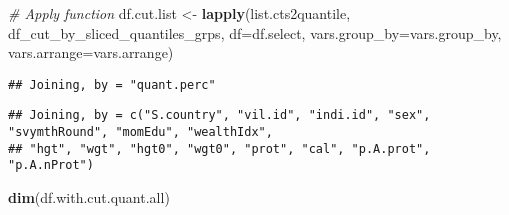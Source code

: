 \documentclass[
]{book}
\newenvironment{Shaded}{\begin{snugshade}}{\end{snugshade}}
\newcommand{\CommentTok}[1]{\textcolor[rgb]{0.56,0.35,0.01}{\textit{#1}}}
\newcommand{\ControlFlowTok}[1]{\textcolor[rgb]{0.13,0.29,0.53}{\textbf{#1}}}
\newcommand{\DataTypeTok}[1]{\textcolor[rgb]{0.13,0.29,0.53}{#1}}
\newcommand{\KeywordTok}[1]{\textcolor[rgb]{0.13,0.29,0.53}{\textbf{#1}}}
\newcommand{\NormalTok}[1]{#1}
\newcommand{\OperatorTok}[1]{\textcolor[rgb]{0.81,0.36,0.00}{\textbf{#1}}}
\newcommand{\StringTok}[1]{\textcolor[rgb]{0.31,0.60,0.02}{#1}}
\begin{document}
\begin{Shaded}
\end{Shaded}

\begin{Shaded}
\begin{Highlighting}[]
\CommentTok{# Apply function}
\NormalTok{df.cut.list <-}\StringTok{ }\KeywordTok{lapply}\NormalTok{(list.cts2quantile, df_cut_by_sliced_quantiles_grps,}
                      \DataTypeTok{df=}\NormalTok{df.select, }\DataTypeTok{vars.group_by=}\NormalTok{vars.group_by, }\DataTypeTok{vars.arrange=}\NormalTok{vars.arrange)}
\end{Highlighting}
\end{Shaded}

\begin{verbatim}
## Joining, by = "quant.perc"
\end{verbatim}

\begin{Shaded}
\end{Shaded}

\begin{verbatim}
## Joining, by = c("S.country", "vil.id", "indi.id", "sex", "svymthRound", "momEdu", "wealthIdx",
## "hgt", "wgt", "hgt0", "wgt0", "prot", "cal", "p.A.prot", "p.A.nProt")
\end{verbatim}

\begin{Shaded}
\begin{Highlighting}[]
\KeywordTok{dim}\NormalTok{(df.with.cut.quant.all)}
\end{Highlighting}
\end{Shaded}
\end{document}

